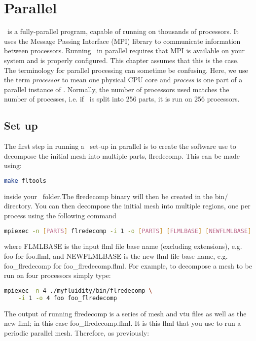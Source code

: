 \chapter{Parallel}

\fluidity\ is a fully-parallel program, capable of running on thousands of processors.
It uses the Message Passing Interface (MPI) library to communicate information between
processors. Running \fluidity\ in parallel requires that MPI is available on your system
and is properly configured. This chapter assumes that this is the case. The
terminology for parallel processing can sometime be confusing. Here, we use the
term \emph{processor} to mean one physical CPU core and \emph{process} is one part
of a parallel instance of \fluidity. Normally, the number of processors used matches
the number of processes, i.e. if \fluidity\ is split into 256 parts, it is run on 256 processors.

\section{Set up}

The first step in running a \fluidity\ set-up in parallel is to create the software
use to decompose the initial mesh into multiple parts, flredecomp. This can be made using:
\begin{lstlisting}[language=bash]
make fltools
\end{lstlisting}
inside your \fluidity\ folder.The flredecomp binary will then be created in the bin/ directory.
You can then decompose the initial mesh into multiple regions, one per process using the following command
\begin{lstlisting}[language=bash]
mpiexec -n [PARTS] flredecomp -i 1 -o [PARTS] [FLMLBASE] [NEWFLMLBASE]
\end{lstlisting}
where FLMLBASE is the \fluidity input flml file base name (excluding
extensions), e.g. foo for foo.flml, and NEWFLMLBASE is the new flml
file base name, e.g. foo\_flredecomp for foo\_flredecomp.flml.  For
example, to decompose a mesh to be run on four processors
simply type:

\begin{lstlisting}[language=bash]
mpiexec -n 4 ./myfluidity/bin/flredecomp \
    -i 1 -o 4 foo foo_flredecomp
\end{lstlisting}

The output of running flredecomp is a series of mesh and vtu files as well as the new flml; in this case foo\_flredecomp.flml. It is this flml that you use to run a periodic parallel mesh. Therefore, as previously:

